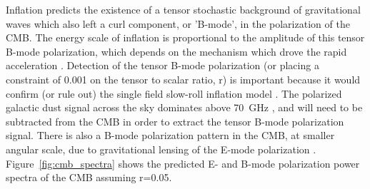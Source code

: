 Inflation predicts the existence of a tensor stochastic background of gravitational waves which also left a curl component, or 'B-mode', in the polarization of the \ac{CMB}.  
The energy scale of inflation is proportional to the amplitude of this tensor B-mode polarization, which depends on the mechanism which drove the rapid acceleration \cite{Grishchuk1975} \cite{starobinsky1982} \cite{Rubakov1982} \cite{starobinskii1983} \cite{Abbott1984}.
Detection of the tensor B-mode polarization (or placing a constraint of 0.001 on the tensor to scalar ratio, r) is important because it would confirm (or rule out) the single field slow-roll inflation model \cite{Abazajian2015}.
The polarized galactic dust signal across the sky dominates above 70~GHz \cite{} \cite{}, and will need to be subtracted from the \ac{CMB} in order to extract the tensor B-mode polarization signal. 
There is also a B-mode polarization pattern in the \ac{CMB}, at smaller angular scale, due to gravitational lensing of the E-mode polarization \cite{polarbear2014} \cite{naess2014} \cite{keisler2015}.
Figure~\ref{fig:cmb_spectra} shows the predicted E- and B-mode polarization power spectra of the \ac{CMB} assuming r=0.05.


%



